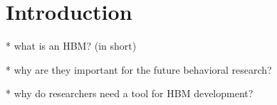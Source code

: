  
\section{Introduction}
* what is an HBM? (in short)

* why are they important for the future behavioral research? \cite{Riley}

* why do researchers need a tool for HBM development?
